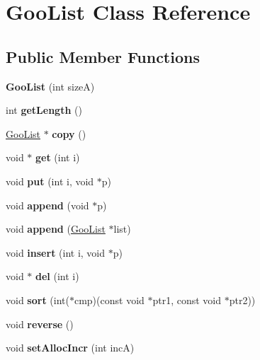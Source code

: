 \hypertarget{class_goo_list}{}\section{Goo\+List Class Reference}
\label{class_goo_list}
\subsection*{Public Member Functions}
\begin{DoxyCompactItemize}
\item 
\mbox{\label{class_goo_list_aaff60749e6761d3c712df94c2cc24889}} 
{\bfseries Goo\+List} (int sizeA)
\item 
\mbox{\label{class_goo_list_a2fc67290193a8b93064cef3de98ceafa}} 
int {\bfseries get\+Length} ()
\item 
\mbox{\label{class_goo_list_ab9909f7bf22688aa2948215d72b006b5}} 
\hyperlink{class_goo_list}{Goo\+List} $\ast$ {\bfseries copy} ()
\item 
\mbox{\label{class_goo_list_aab7c65d7f25a2100fc78ed4b6840b0d0}} 
void $\ast$ {\bfseries get} (int i)
\item 
\mbox{\label{class_goo_list_af066eb3a6aeb7f231e2fce302b805a96}} 
void {\bfseries put} (int i, void $\ast$p)
\item 
\mbox{\label{class_goo_list_aec0979af32a614f3a73610add47096a1}} 
void {\bfseries append} (void $\ast$p)
\item 
\mbox{\label{class_goo_list_a6ff781ed4077c805c52e2d08313cacb4}} 
void {\bfseries append} (\hyperlink{class_goo_list}{Goo\+List} $\ast$list)
\item 
\mbox{\label{class_goo_list_a2efadc66b675f29becd2e09e7bc603ba}} 
void {\bfseries insert} (int i, void $\ast$p)
\item 
\mbox{\label{class_goo_list_a64563b5e0d5c0c047882c7f16f5775a9}} 
void $\ast$ {\bfseries del} (int i)
\item 
\mbox{\label{class_goo_list_a7fd789c85d1bb15e2df8d4e0fd348b8b}} 
void {\bfseries sort} (int($\ast$cmp)(const void $\ast$ptr1, const void $\ast$ptr2))
\item 
\mbox{\label{class_goo_list_a5489880c51388448a3cb5921869cb849}} 
void {\bfseries reverse} ()
\item 
\mbox{\label{class_goo_list_ad9d1e1703e0a4d3b17f8c787c6258f64}} 
void {\bfseries set\+Alloc\+Incr} (int incA)
\end{DoxyCompactItemize}


